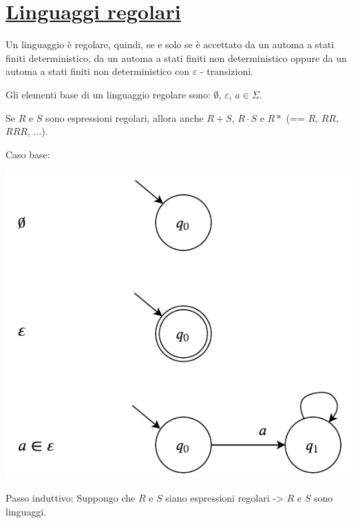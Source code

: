 \documentclass[a4paper, 10pt]{report}
\begin{document}
\section*{\underline{Linguaggi regolari}}
Un linguaggio è regolare, quindi, se e solo se è accettato da un automa a stati finiti deterministico, da un automa a stati finiti non deterministico oppure da un automa a stati finiti non deterministico con $\varepsilon$ - transizioni.

Gli elementi base di un linguaggio regolare sono: $\emptyset$, $\varepsilon$, $a \in \Sigma$.

Se $R$ e $S$ sono espressioni regolari, allora anche $R + S$, $R \cdot S$ e $R*$ (== $R$, $RR$, $RRR$, ...).

\begin{tcolorbox}[title=\textbf{Dimostrazione (per induzione) grafica}]

Caso base:

\begin{center}
\includegraphics[scale=1]{16ottobre07.pdf}
\end{center}

Passo induttivo: Suppongo che $R$ e $S$ siano espressioni regolari -> $R$ e $S$ sono linguaggi.


\end{tcolorbox}
\end{document}
